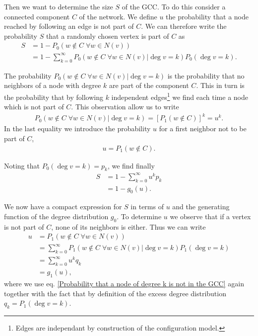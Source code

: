 \documentclass[
11pt, %
english, %
singlespacing, %
nolistspacing, %
liststotoc, %
headsepline, %
]{MastersDoctoralThesis} %
\begin{document}

Then we want to determine the size $S$ of the GCC. To do this consider a connected component $C$ of the network. We define $u$ the probability that a node reached by following an edge is not part of $C$. We can therefore write the probability $S$ that a randomly chosen vertex is part of $C$ as
\begin{align}
	S 	&= 1 - P_0(w \notin C\; \forall w \in N(v))\\
		&= 1 - \sum_{k=0}^\infty P_0(w \notin C\; \forall w \in N(v)|\deg{v} = k) P_0(\deg{v} = k).
\end{align}

The probability $P_0(w \notin C\; \forall w \in N(v)|\deg{v} = k)$ is the probability that no neighbors of a node with degree $k$ are part of the component $C$. This in turn is the probability that by following $k$ independent edges\footnote{Edges are independant by construction of the configuration model.} we find each time a node which is not part of $C$. This observation allow us to write
\begin{align}
	P_0(w \notin C\; \forall w \in N(v)|\deg{v} = k) = \left[P_1(w \notin C)\right]^k = u^k. \label{Probability that a node of degree k is not in the GCC}
\end{align}
In the last equality we introduce the probability $u$ for a first neighbor not to be part of  $C$,
\begin{align}
	u = P_1(w \notin C). \label{Definition of u}
\end{align}

Noting that $P_0(\deg{v} = k) = p_k$, we find finally
\begin{align}
	S	&= 1 - \sum_{k=0}^\infty u^k p_k \\
		&= 1 - g_0(u).
\end{align}

We now have a compact expression for $S$ in terms of $u$ and the generating function of the degree distribution $g_0$. To determine $u$ we observe that if a vertex is not part of $C$, none of its neighbors is either. Thus we can write
\begin{align}
	u 	&= P_1(w \notin C \; \forall w \in N(v)) \\
		&= \sum_{k=0}^\infty P_1(w \notin C \; \forall w \in N(v)| \deg{v} = k) P_1(\deg{v} = k) \\
		&= \sum_{k=0}^\infty u^k q_k \\
		&= g_1(u),
\end{align}
where we use eq. \eqref{Probability that a node of degree k is not in the GCC} again together with the fact that by definition of the excess degree distribution $q_k = P_1(\deg{v} = k)$.
\end{document}
